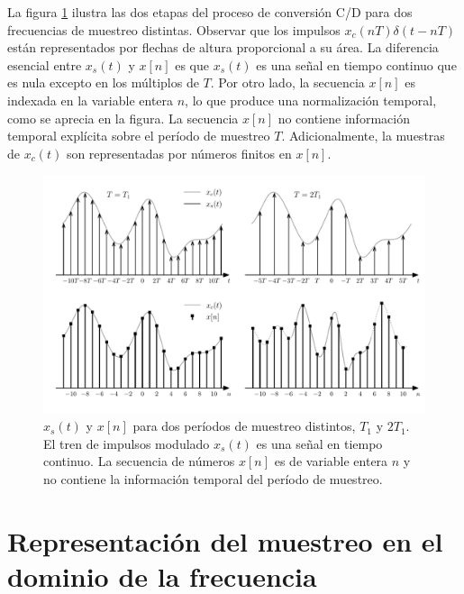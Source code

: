 \documentclass[a4paper]{report}
\begin{document}
La figura \ref{fig:sampling_cd_conversion_math_representation} ilustra las dos etapas del proceso de conversión C/D para dos frecuencias de muestreo distintas. Observar que los impulsos \(x_c(nT)\delta(t-nT)\) están representados por flechas de altura proporcional a su área. La diferencia esencial entre \(x_s(t)\) y \(x[n]\) es que \(x_s(t)\) es una señal en tiempo continuo que es nula excepto en los múltiplos de \(T\). Por otro lado, la secuencia \(x[n]\) es indexada en la variable entera \(n\), lo que produce una normalización temporal, como se aprecia en la figura. La secuencia \(x[n]\) no contiene información temporal explícita sobre el período de muestreo \(T\). Adicionalmente, la muestras de \(x_c(t)\) son representadas por números finitos en \(x[n]\).
\begin{figure}[!htb]
 \begin{center}
 \includegraphics[width=1\textwidth]{figuras/sampling_cd_conversion_math_representation.pdf}
 \caption{\label{fig:sampling_cd_conversion_math_representation} \(x_s(t)\) y \(x[n]\) para dos períodos de muestreo distintos, \(T_1\) y \(2T_1\). El tren de impulsos modulado \(x_s(t)\) es una señal en tiempo continuo. La secuencia de números \(x[n]\) es de variable entera \(n\) y no contiene la información temporal del período de muestreo.}
 \end{center}
\end{figure}

\section{Representación del muestreo en el dominio de la frecuencia}\label{sec:sampling_frequency_domain_representation}
\end{document}
